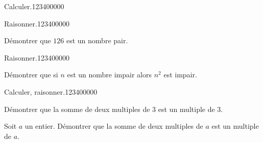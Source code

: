 \begin{pageAD}
\begin{ExoCad}{Calculer.}{1234}{0}{0}{0}{0}{0}

\end{ExoCad}


\begin{ExoCad}{Raisonner.}{1234}{0}{0}{0}{0}{0}

Démontrer que $126$ est un nombre pair.


\end{ExoCad}



\begin{ExoCad}{Raisonner.}{1234}{0}{0}{0}{0}{0}

Démontrer que si $n$ est un nombre impair alors $n^2$ est impair.


\end{ExoCad}



\begin{ExoCad}{Calculer, raisonner.}{1234}{0}{0}{0}{0}{0}

Démontrer que la somme de deux multiples de $3$ est un multiple de $3$. 

Soit $a$ un entier. Démontrer que la somme de deux multiples de $a$ est un multiple de $a$. 

\end{ExoCad}




\end{pageAD}
